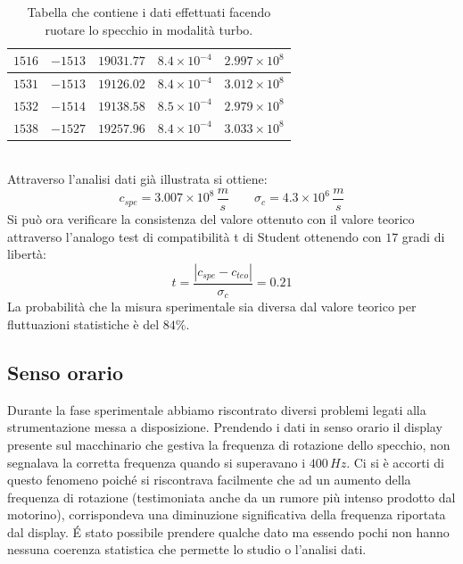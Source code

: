 \begin{table}[ht]
\begin{tabular}{|c|c|c|c|c|}
    \hline
    $1516$ & $-1513$ & $19031.77$ & $8.4\times10^{-4}$ & $2.997\times10^8$ \\
    \hline
    $1531$ & $-1513$ & $19126.02$ & $8.4\times10^{-4}$ & $3.012\times10^8$ \\
    \hline
    $1532$ & $-1514$ & $19138.58$ & $8.5\times10^{-4}$ & $2.979\times10^8$ \\
    \hline
    $1538$ & $-1527$ & $19257.96$ & $8.4\times10^{-4}$ & $3.033\times10^8$ \\
    \hline
    \end{tabular}
    \caption{Tabella che contiene i dati effettuati facendo ruotare lo specchio in modalità turbo.}
    \label{turbo}
\end{table}\\
Attraverso l'analisi dati già illustrata si ottiene:
\begin{equation}
    \nonumber
    c_{spe}=3.007\times10^8 \, \frac{m}{s} \qquad \sigma_c=4.3\times10^6\, \frac{m}{s}
\end{equation}
Si può ora verificare la consistenza del valore ottenuto con il valore teorico attraverso l'analogo test di compatibilità t di Student ottenendo con $17$ gradi di libertà:
\begin{equation}
    t=\frac{|c_{spe}-c_{teo}|}{\sigma_c}=0.21
\end{equation}
La probabilità che la misura sperimentale sia diversa dal valore teorico per fluttuazioni statistiche è del $84\%$.
\subsection{Senso orario}
Durante la fase sperimentale abbiamo riscontrato diversi problemi legati alla strumentazione messa a disposizione. Prendendo i dati in senso orario il display presente sul macchinario che gestiva la frequenza di rotazione dello specchio, non segnalava la corretta frequenza quando si superavano i $400\, Hz$. Ci si è accorti di questo fenomeno poiché si riscontrava facilmente che ad un aumento della frequenza di rotazione (testimoniata anche da un rumore più intenso prodotto dal motorino), corrispondeva una diminuzione significativa della frequenza riportata dal display. \'E stato possibile prendere qualche dato ma essendo pochi non hanno nessuna coerenza statistica che permette lo studio o l'analisi dati. 

